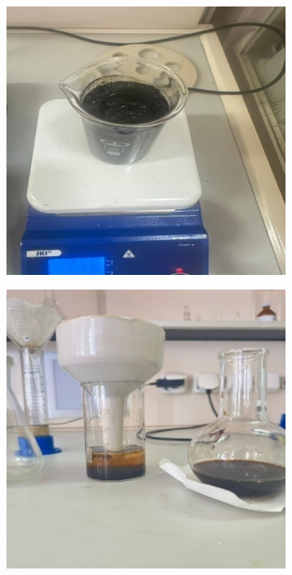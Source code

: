 \begin{figure}[H]
    \centering
    \begin{subfigure}[b]{0.32\textwidth}
        \centering
        \includegraphics[width=\textwidth, height=\textwidth]{media/gorn3/image4}
    \end{subfigure}
    \begin{subfigure}[b]{0.32\textwidth}
        \centering
        \includegraphics[width=\textwidth, height=\textwidth]{media/gorn3/image5}

\end{subfigure}
\end{figure}

